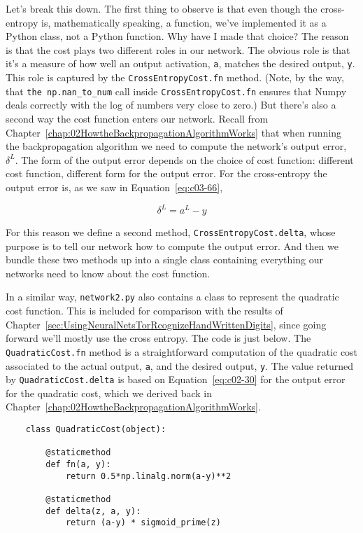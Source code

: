 Let's break this down. The first thing to observe is that even though the cross-entropy is, mathematically speaking, a function, we've implemented it as a Python class, not a Python function. Why have I made that choice? The reason is that the cost plays two different roles in our network. The obvious role is that it's a measure of how well an output activation, \lstinline{a}, matches the desired output, \lstinline{y}. This role is captured by the \lstinline{CrossEntropyCost.fn} method. (Note, by the way, that \lstinline{the np.nan_to_num} call inside \lstinline{CrossEntropyCost.fn} ensures that Numpy deals correctly with the log of numbers very close to zero.) But there's also a second way the cost function enters our network. Recall from Chapter~\ref{chap:02HowtheBackpropagationAlgorithmWorks} that when running the backpropagation algorithm we need to compute the network's output error,  $\delta^{L}$. The form of the output error depends on the choice of cost function: different cost function, different form for the output error. For the cross-entropy the output error is, as we saw in Equation~\ref{eq:c03-66},

\begin{equation}
    \delta^{L}=a^{L}-y
    \label{eq:c03-99}
    \end{equation}

For this reason we define a second method, \lstinline{CrossEntropyCost.delta}, whose purpose is to tell our network how to compute the output error. And then we bundle these two methods up into a single class containing everything our networks need to know about the cost function.

In a similar way, \lstinline{network2.py} also contains a class to represent the quadratic cost function. This is included for comparison with the results of Chapter~\ref{sec:UsingNeuralNetsTorRcognizeHandWrittenDigits}, since going forward we'll mostly use the cross entropy. The code is just below. The \lstinline{QuadraticCost.fn} method is a straightforward computation of the quadratic cost associated to the actual output, \lstinline{a}, and the desired output, \lstinline{y}. The value returned by \lstinline{QuadraticCost.delta} is based on Equation~\ref{eq:c02-30} for the output error for the quadratic cost, which we derived back in Chapter~\ref{chap:02HowtheBackpropagationAlgorithmWorks}.


\begin{lstlisting}
    class QuadraticCost(object):
    
        @staticmethod
        def fn(a, y):
            return 0.5*np.linalg.norm(a-y)**2
    
        @staticmethod
        def delta(z, a, y):
            return (a-y) * sigmoid_prime(z)
\end{lstlisting}        


